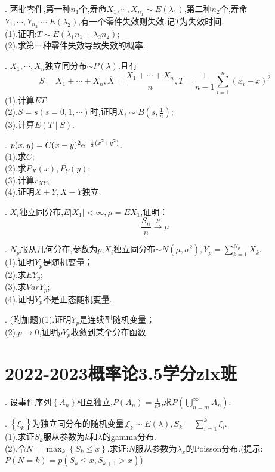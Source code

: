 \documentclass[lang=cn,10pt]{elegantbook}
\begin{document}
. 两批零件,第一种$n_1$个,寿命$X_1,\cdots,X_{n_1}\sim E(\lambda_1)$,第二种$n_2$个,寿命$Y_1,\cdots,Y_{n_2}\sim E(\lambda_2)$,有一个零件失效则失效.记$T$为失效时间.\\
(1).证明:$T\sim E(\lambda_1n_1+\lambda_2n_2)$;\\
(2).求第一种零件失效导致失效的概率.

. $X_1,\cdots,X_n$独立同分布$\sim P(\lambda)$.且有$$S=X_1+\cdots+X_n,\overline{X}=\frac{X_1+\cdots+X_n}{n},T=\frac{1}{n-1}\sum_{i=1}^{n}(x_i-\overline{x})^2$$
(1).计算$ET$;\\
(2).$S=s(s=0,1,\cdots)$时,证明$X_i\sim B(s,\frac{1}{n})$;\\
(3).计算$E(T\mid S)$.

. $p(x,y)=C(x-y)^2{\rm e}^{-\frac{1}{2}(x^2+y^2)}$.\\
(1).求$C$;\\
(2).求$P_X(x),P_Y(y)$;\\
(3).计算$r_{XY}$;\\
(4).证明$X+Y,X-Y$独立.

. $X_i$独立同分布,$E|X_1|<\infty,\mu=EX_1$,证明：$$\frac{S_n}{n}\xrightarrow{P}\mu$$

. $N_p$服从几何分布,参数为$p$,$X_i$独立同分布$\sim N(\mu,\sigma^2),Y_p=\sum_{k=1}^{N_p}X_k$.\\
(1).证明$Y_p$是随机变量；\\
(2).求$EY_p$;\\
(3).求$Var Y_p$;\\
(4).证明$Y_p$不是正态随机变量.

. (附加题)(1).证明$Y_p$是连续型随机变量；\\
(2).$p\to 0$,证明$pY_p$收敛到某个分布函数.
\newpage

\section{2022-2023概率论3.5学分zlx班}
. 设事件序列$\left\{A_n\right\}$相互独立,$P(A_n)=\frac{1}{n^2}$,求$P\left(\bigcup_{n=m}^{\infty}A_n\right)$.

. $\left\{\xi_k\right\}$为独立同分布的随机变量,$\xi_k\sim E(\lambda),S_k=\sum_{i=1}^k\xi_i$.\\
(1).求证$S_k$服从参数为$k$和$\lambda$的gamma分布.\\
(2).令$N=\max_{k}\left\{S_k\leq x\right\}$.求证:$N$服从参数为$\lambda_x$的Poisson分布.(提示:$P(N=k)=p(S_k\leq x,S_{k+1}>x)$)
\end{document}
